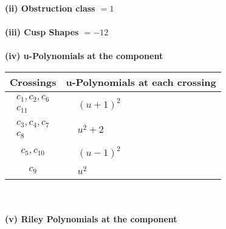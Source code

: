 \documentclass[1p]{elsarticle_modified}
\theoremstyle{definition}
\begin{document}
\flushleft \textbf{(ii) Obstruction class $= 1$}\\~\\
\flushleft \textbf{(iii) Cusp Shapes $= -12$}\\~\\
\newpage\renewcommand{\arraystretch}{1}
\flushleft \textbf{(iv) u-Polynomials at the component}\newline \\
\begin{tabular}{m{50pt}|m{274pt}}
Crossings & \hspace{64pt}u-Polynomials at each crossing \\
\hline $$\begin{aligned}c_{1},c_{2},c_{6}\\c_{11}\end{aligned}$$&$\begin{aligned}
&(u+1)^2
\end{aligned}$\\
\hline $$\begin{aligned}c_{3},c_{4},c_{7}\\c_{8}\end{aligned}$$&$\begin{aligned}
&u^2+2
\end{aligned}$\\
\hline $$\begin{aligned}c_{5},c_{10}\end{aligned}$$&$\begin{aligned}
&(u-1)^2
\end{aligned}$\\
\hline $$\begin{aligned}c_{9}\end{aligned}$$&$\begin{aligned}
&u^2
\end{aligned}$\\
\hline
\end{tabular}\\~\\
\newpage\renewcommand{\arraystretch}{1}
\flushleft \textbf{(v) Riley Polynomials at the component}\newline \\
\end{document}
